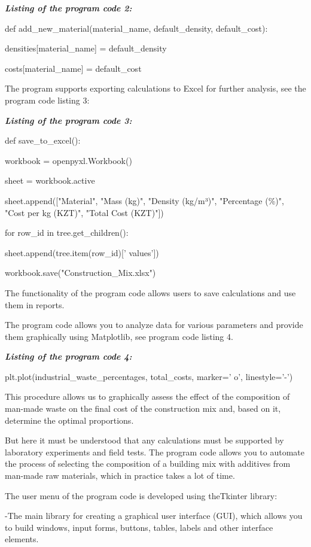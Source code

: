 {\emph{{\bfseries Listing of the program code 2:}}

def add\_new\_material(material\_name, default\_density, default\_cost):

densities{[}material\_name{]} = default\_density

costs{[}material\_name{]} = default\_cost

The program supports exporting calculations to Excel for further
analysis, see the program code listing 3:

\emph{{\bfseries Listing of the program code 3:}}

def save\_to\_excel():

workbook = openpyxl.Workbook()

sheet = workbook.active

sheet.append({[}"Material", "Mass (kg)", "Density (kg/m³)", "Percentage
(\%)", "Cost per kg (KZT)", "Total Cost (KZT)"{]})

for row\_id in tree.get\_children():

sheet.append(tree.item(row\_id){[}' values'{]})

workbook.save("Construction\_Mix.xlsx")

The functionality of the program code allows users to save calculations
and use them in reports.

The program code allows you to analyze data for various parameters and
provide them graphically using Matplotlib, see program code listing 4.

\emph{{\bfseries Listing of the program code 4:}}

plt.plot(industrial\_waste\_percentages, total\_costs,
marker=' o',
linestyle='-')

This procedure allows us to graphically assess the effect of the
composition of man-made waste on the final cost of the construction mix
and, based on it, determine the optimal proportions.

But here it must be understood that any calculations must be supported
by laboratory experiments and field tests. The program code allows you
to automate the process of selecting the composition of a building mix
with additives from man-made raw materials, which in practice takes a
lot of time.

The user menu of the program code is developed using theTkinter library:

-The main library for creating a graphical user interface (GUI), which
allows you to build windows, input forms, buttons, tables, labels and
other interface elements.

}
